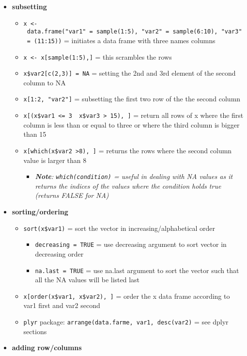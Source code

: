 \documentclass[
]{article}
\providecommand{\tightlist}{%
  \setlength{\itemsep}{0pt}\setlength{\parskip}{0pt}}
\begin{document}
\begin{itemize}
\tightlist
\item
  \textbf{subsetting}

  \begin{itemize}
  \tightlist
  \item
    \texttt{x\ \textless{}-\ data.frame("var1"\ =\ sample(1:5),\ "var2"\ =\ sample(6:10),\ "var3"\ =\ (11:15))}
    = initiates a data frame with three names columns
  \item
    \texttt{x\ \textless{}-\ x{[}sample(1:5),{]}} = this scrambles the
    rows
  \item
    \texttt{x\$var2{[}c(2,3){]}\ =\ NA} = setting the 2nd and 3rd
    element of the second column to NA
  \item
    \texttt{x{[}1:2,\ "var2"{]}} = subsetting the first two row of the
    the second column
  \item
    \texttt{x{[}(x\$var1\ \textless{}=\ 3\ \textbar{}\ x\$var3\ \textgreater{}\ 15),\ {]}}
    = return all rows of x where the first column is less than or equal
    to three or where the third column is bigger than 15
  \item
    \texttt{x{[}which(x\$var2\ \textgreater{}8),\ {]}} = returns the
    rows where the second column value is larger than 8

    \begin{itemize}
    \tightlist
    \item
      \emph{\textbf{Note}: \texttt{which(condition)} = useful in dealing
      with NA values as it returns the indices of the values where the
      condition holds true (returns FALSE for NA) }
    \end{itemize}
  \end{itemize}
\item
  \textbf{sorting/ordering}

  \begin{itemize}
  \tightlist
  \item
    \texttt{sort(x\$var1)} = sort the vector in increasing/alphabetical
    order

    \begin{itemize}
    \tightlist
    \item
      \texttt{decreasing\ =\ TRUE} = use decreasing argument to sort
      vector in decreasing order
    \item
      \texttt{na.last\ =\ TRUE} = use na.last argument to sort the
      vector such that all the NA values will be listed last
    \end{itemize}
  \item
    \texttt{x{[}order(x\$var1,\ x\$var2),\ {]}} = order the x data frame
    according to var1 first and var2 second
  \item
    \texttt{plyr} package:
    \texttt{arrange(data.farme,\ var1,\ desc(var2)} = see dplyr sections
  \end{itemize}
\item
  \textbf{adding row/columns}


\end{itemize}
\end{document}
